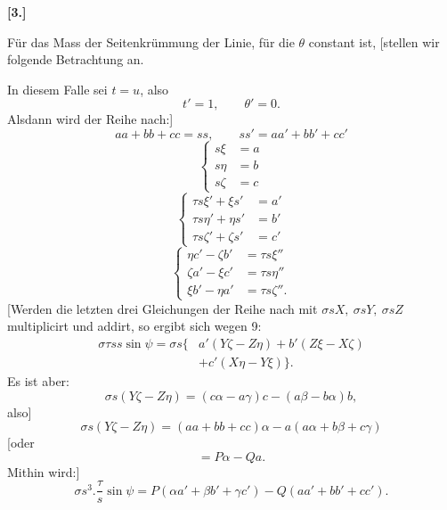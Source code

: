 %
\begin{center}\bfseries [3.]\end{center}
\noindent\hspace*{1.2em}Für das Mass der Seitenkrümmung der Linie, für die $\theta$ constant ist, [stellen wir folgende Betrachtung an.

In diesem Falle sei $t=u$, also
\[
t'=1,\qquad \theta'=0.
\]
Alsdann wird der Reihe nach:]
\begin{equation}\tag*{[$5'$]}
aa+bb+cc=ss,\qquad ss'=aa'+bb'+cc'
\end{equation}
\begin{equation}\tag*{[$4'$]}
\left\{\begin{aligned}s\xi&=a\\s\eta&=b\\s\zeta&=c\end{aligned}\right.
\end{equation}
\begin{equation}\tag*{[$12'$]}
\left\{\begin{aligned}
\tau s\xi'+\xi s'&=a'\\
\tau s\eta'+\eta s'&=b'\\
\tau s\zeta'+\zeta s'&=c'
\end{aligned}\right.
\end{equation}
\begin{equation}\tag*{[$8'$]}
\left\{\begin{aligned}
\eta c'-\zeta b'&=\tau s\xi''\\
\zeta a'-\xi c'&=\tau s\eta''\\
\xi b'-\eta a'&=\tau s\zeta''.
\end{aligned}\right.
\end{equation}
[Werden die letzten drei Gleichungen der Reihe nach mit $\sigma sX,\ \sigma sY,\ \sigma sZ$ multiplicirt und addirt, so ergibt sich wegen 9:
\[
\begin{aligned}
\sigma\tau ss\sin\psi=\sigma s\{&a'(Y\zeta-Z\eta)+b'(Z\xi-X\zeta)\\
&+c'(X\eta-Y\xi)\}.
\end{aligned}
\]
Es ist aber:
\[
\sigma s(Y\zeta-Z\eta)=(c\alpha-a\gamma)c-(a\beta-b\alpha)b,
\]
also]
\[
\sigma s(Y\zeta-Z\eta)=(aa+bb+cc)\alpha-a(a\alpha+b\beta+c\gamma)
\]
[oder
\[
=P\alpha-Qa.
\]
Mithin wird:]
\[
\sigma s^3.\frac{\tau}{s}\sin\psi=P(\alpha a'+\beta b'+\gamma c')-Q(aa'+bb'+cc').
\]
